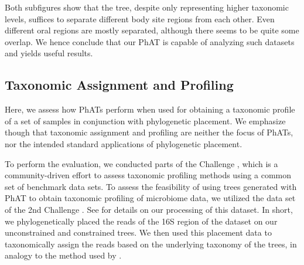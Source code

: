 Both subfigures show that the tree, despite only representing higher taxonomic levels,
suffices to separate different body site regions from each other.
Even different oral regions are mostly separated, although there seems to be quite some overlap.
We hence conclude that our \ac{PhAT} is capable of analyzing such datasets and yields useful results.


\subsection{Taxonomic Assignment and Profiling}
\label{ch:AutomaticTrees:sec:Evaluation:sub:TaxonomicAssignmentProfiling}

Here, we assess how \acp{PhAT} perform when used
for obtaining a taxonomic profile of a set of samples in conjunction with phylogenetic placement.
We emphasize though that taxonomic assignment and profiling are neither the focus of \acp{PhAT},
nor the intended standard applications of phylogenetic placement.

To perform the evaluation, we conducted parts of the  Challenge \citep{Sczyrba2017},
which is a community-driven effort to assess taxonomic profiling methods using a common set of benchmark data sets.
To assess the feasibility of using trees generated with \ac{PhAT} to obtain taxonomic profiling of microbiome data,
we utilized the  data set of the 2nd  Challenge \citep{Bremges2018}.
See  for details on our processing of this dataset.
In short, we phylogenetically placed the reads of the 16S region of the dataset
on our unconstrained and constrained  trees.
We then used this placement data to taxonomically assign the reads
based on the underlying  taxonomy of the trees,
in analogy to the method used by  \citep{Kozlov2016}.

